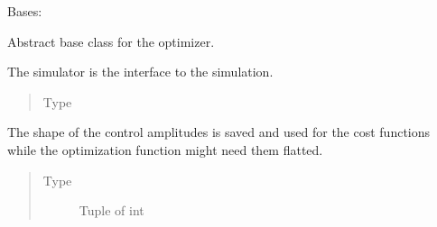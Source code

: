 \documentclass[letterpaper,10pt,english]{sphinxmanual}
\begin{document}

\begin{fulllineitems}
\label{\detokenize{qsim:qsim.optimize.Optimizer}}
Bases: 

Abstract base class for the optimizer.

\begin{fulllineitems}
\label{\detokenize{qsim:qsim.optimize.Optimizer.system_simulator}}
The simulator is the interface to the simulation.
\begin{quote}\begin{description}
\item[{Type}] \leavevmode
{\hyperref[\detokenize{qsim:qsim.simulator.Simulator}]{}}

\end{description}\end{quote}

\end{fulllineitems}


\begin{fulllineitems}
\label{\detokenize{qsim:qsim.optimize.Optimizer.pulse_shape}}
The shape of the control amplitudes is saved and used for the
cost functions while the optimization function might need them flatted.
\begin{quote}\begin{description}
\item[{Type}] \leavevmode
Tuple of int


\end{description}
\end{quote}
\end{fulllineitems}
\end{fulllineitems}
\end{document}
